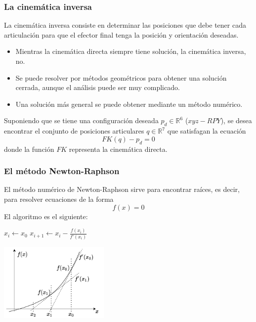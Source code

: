 \begin{frame}\frametitle{La cinemática inversa}
  La cinemática inversa consiste en determinar las posiciones que debe tener cada articulación para que el efector final tenga la posición y orientación deseadas.
  \begin{itemize}
  \item Mientras la cinemática directa siempre tiene solución, la cinemática inversa, no.
  \item Se puede resolver por métodos geométricos para obtener una solución cerrada, aunque el análisis puede ser muy complicado.
  \item Una solución más general se puede obtener mediante un método numérico. 
  \end{itemize}
  Suponiendo que se tiene una configuración deseada $p_d \in \mathbb{R}^6$ ($xyz-RPY$), se desea encontrar el conjunto de posiciones articulares $q\in\mathbb{R}^7$ que satisfagan la ecuación
  \[FK(q) - p_d = 0\]
  donde la función $FK$ representa la cinemática directa. 
\end{frame}

\begin{frame}\frametitle{El método Newton-Raphson}
  El método numérico de Newton-Raphson sirve para encontrar raíces, es decir, para resolver ecuaciones de la forma
  \[f(x) = 0\]
  El algoritmo es el siguiente:
  \[\]
  \begin{multicols}{2}
  \begin{algorithm}[H]
    \DontPrintSemicolon
    $x_i \leftarrow x_0$\;
    {
       $x_{i+1} \leftarrow x_i - \frac{f(x_i)}{f'(x_i)}$
    }
  \end{algorithm}
  \includegraphics[width=0.4\textwidth]{Figures/NewtonRaphson.pdf}
  \end{multicols}
\end{frame}

